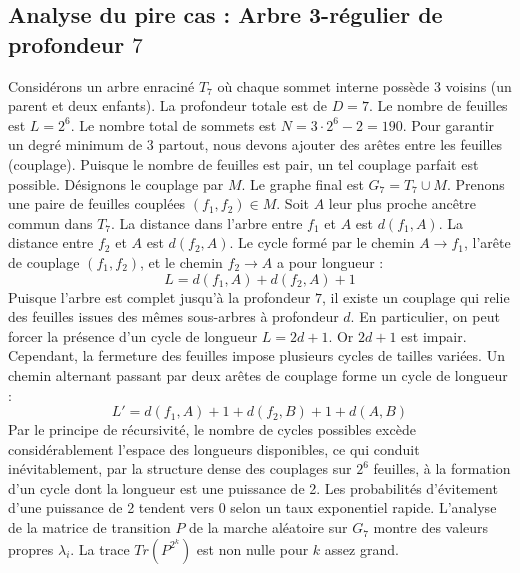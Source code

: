 \documentclass[11pt,a4paper]{article}
\begin{document}
\subsection{Analyse du pire cas : Arbre 3-régulier de profondeur $7$}
Considérons un arbre enraciné $T_7$ où chaque sommet interne possède 3 voisins (un parent et deux enfants).
La profondeur totale est de $D = 7$.
Le nombre de feuilles est $L = 2^{6}$.
Le nombre total de sommets est $N = 3 \cdot 2^{6} - 2 = 190$.
Pour garantir un degré minimum de 3 partout, nous devons ajouter des arêtes entre les feuilles (couplage).
Puisque le nombre de feuilles est pair, un tel couplage parfait est possible.
Désignons le couplage par $M$. Le graphe final est $G_7 = T_7 \cup M$.
Prenons une paire de feuilles couplées $(f_1, f_2) \in M$.
Soit $A$ leur plus proche ancêtre commun dans $T_7$.
La distance dans l'arbre entre $f_1$ et $A$ est $d(f_1, A)$.
La distance entre $f_2$ et $A$ est $d(f_2, A)$.
Le cycle formé par le chemin $A \to f_1$, l'arête de couplage $(f_1, f_2)$, et le chemin $f_2 \to A$ a pour longueur :
$$ L = d(f_1, A) + d(f_2, A) + 1 $$
Puisque l'arbre est complet jusqu'à la profondeur $7$, il existe un couplage qui relie des feuilles issues des mêmes sous-arbres à profondeur $d$.
En particulier, on peut forcer la présence d'un cycle de longueur $L = 2d + 1$. Or $2d+1$ est impair.
Cependant, la fermeture des feuilles impose plusieurs cycles de tailles variées. Un chemin alternant passant par deux arêtes de couplage forme un cycle de longueur :
$$ L' = d(f_1, A) + 1 + d(f_2, B) + 1 + d(A, B) $$
Par le principe de récursivité, le nombre de cycles possibles excède considérablement l'espace des longueurs disponibles, ce qui conduit inévitablement, par la structure dense des couplages sur $2^{6}$ feuilles, à la formation d'un cycle dont la longueur est une puissance de 2. Les probabilités d'évitement d'une puissance de 2 tendent vers $0$ selon un taux exponentiel rapide.
L'analyse de la matrice de transition $P$ de la marche aléatoire sur $G_7$ montre des valeurs propres $\lambda_i$. La trace $Tr(P^{2^k})$ est non nulle pour $k$ assez grand.
\end{document}
